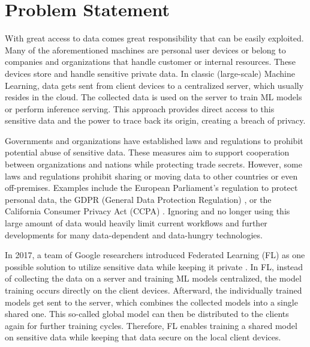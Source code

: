 \section{Problem Statement}\label{section:problem_statement}

With great access to data comes great responsibility that can be easily exploited.
Many of the aforementioned machines are personal user devices or belong to companies and organizations that handle customer or internal resources.
These devices store and handle sensitive private data.
In classic (large-scale) Machine Learning, data gets sent from client devices to a centralized server, which usually resides in the cloud.
The collected data is used on the server to train ML models or perform inference serving.
This approach provides direct access to this sensitive data and the power to trace back its origin, creating a breach of privacy.

Governments and organizations have established laws and regulations to prohibit potential abuse of sensitive data.
These measures aim to support cooperation between organizations and nations while protecting trade secrets.
However, some laws and regulations prohibit sharing or moving data to other countries or even off-premises.
Examples include the European Parliament's regulation to protect personal data, the GDPR (General Data Protection Regulation) \cite{eu_regulation}, or the California Consumer Privacy Act (CCPA) \cite{california_consumer_privacy_act}.
Ignoring and no longer using this large amount of data would heavily limit current workflows and further developments for many data-dependent and data-hungry technologies.

In 2017, a team of Google researchers introduced Federated Learning (FL) as one possible solution to utilize sensitive data while keeping it private \cite{paper:original_fl}.
In FL, instead of collecting the data on a server and training ML models centralized, the model training occurs directly on the client devices.
Afterward, the individually trained models get sent to the server, which combines the collected models into a single shared one.
This so-called global model can then be distributed to the clients again for further training cycles.
Therefore, FL enables training a shared model on sensitive data while keeping that data secure on the local client devices. 

